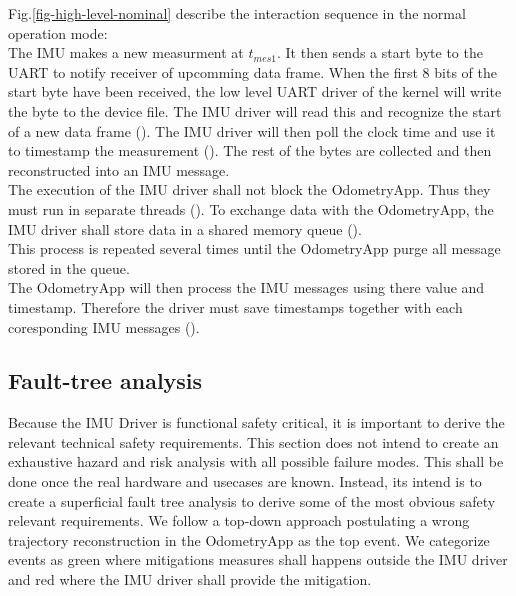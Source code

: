 Fig.\ref{fig-high-level-nominal} describe the interaction sequence in the normal operation mode:\\
The IMU makes a new measurment at $t_{mes1}$.
It then sends a start byte to the UART to notify receiver of upcomming data frame.
When the first 8 bits of the start byte have been received, the low level UART driver of the kernel will write the byte to the device file.
The IMU driver will read this and recognize the start of a new data frame ().
The IMU driver will then poll the clock time and use it to timestamp the measurement ().
The rest of the bytes are collected and then reconstructed into an IMU message.\\
The execution of the IMU driver shall not block the OdometryApp. Thus they must run in separate threads ().
To exchange data with the OdometryApp, the IMU driver shall store data in a shared memory queue ().\\
This process is repeated several times until the OdometryApp purge all message stored in the queue.\\
The OdometryApp will then process the IMU messages using there value and timestamp.
Therefore the driver must save timestamps together with each coresponding IMU messages ().

\subsection{Fault-tree analysis}
Because the IMU Driver is functional safety critical, it is important to derive the relevant technical safety requirements.
This section does not intend to create an exhaustive hazard and risk analysis with all possible failure modes.
This shall be done once the real hardware and usecases are known.
Instead, its intend is to create a superficial fault tree analysis to derive some of the most obvious safety relevant requirements.
We follow a top-down approach postulating a wrong trajectory reconstruction in the OdometryApp as the top event.
We categorize events as green where mitigations measures shall happens outside the IMU driver and red where the IMU driver shall provide the mitigation.


